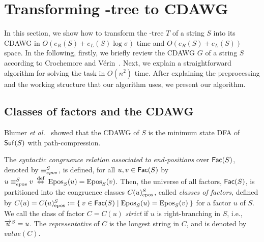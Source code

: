 

  

  

\section{Transforming \LPTrm-tree to CDAWG}
\label{sec:lpt:to:cdawg}
In this section, we show how to transform the \LPTrm-tree $T$ of a string $S$ into its CDAWG in $O(e_R(S) + e_L(S)\log\sigma)$ time and $O(e_R(S) + e_L(S))$ space.
In the following, firstly, we briefly review the CDAWG $G$ of a string $S$ according to Crochemore and V\'erin~\cite{crochemore:verin1997direct}. Next, we explain a straightforward algorithm for solving the task in $O(n^2)$ time. After explaining the preprocessing and the working structure that our algorithm uses, we present our algorithm. 

\subsection{Classes of factors and the CDAWG}

Blumer \textit{et al.}~\cite{blumer1987complete} showed that the CDAWG of $S$ is the minimum state DFA of $\mathsf{Suf}{(S)}$ with path-compression.

The \textit{syntactic congruence relation associated to end-positions} over $\mathsf{Fac}{(S)}$, denoted by $\equiv^{S}_{epos}$, is defined, for all $u, v \in \mathsf{Fac}{(S)}$ by 
\begin{math}
  u \equiv^{S}_{epos} v \mathbin{\,\stackrel{\textrm{def}}{\mathbin{\,\Leftrightarrow\,}}\,} \mathrm{Epos}_{S}(u) = \mathrm{Epos}_{S}(v). 
\end{math}
Then, the universe of all factors, $\mathsf{Fac}{(S)}$, is partitioned into the congruence classes $C({u})^{S}_{\mathrm{epos}}$, called \textit{classes of factors}, defined by 
$C(u) = C({u})^{S}_{\mathrm{epos}} := \{\kern0.2em v \in \mathsf{Fac}{(S)} \mid \mathrm{Epos}_{S}(u) = \mathrm{Epos}_{S}(v) \kern0.2em\}$
for a factor $u$ of $S$. We call the class of factor $C = C(u)$ \textit{strict} if $u$ is right-branching in $S$, i.e., $\overrightarrow{u}^{S} = u$. 
The \textit{representative} of $C$ is the longest string in $C$, and is denoted by $value(C)$. 

